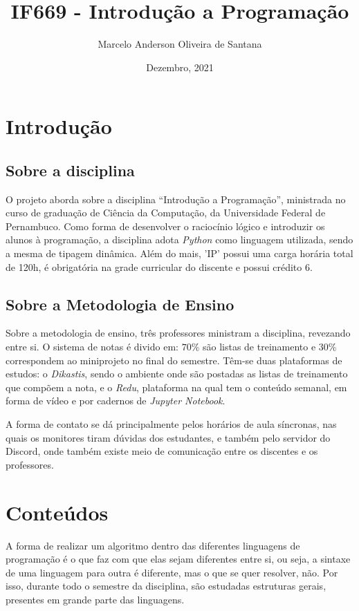 \documentclass[a4paper, 12pt]{article}
\title{IF669 - Introdução a Programação}
\author{Marcelo Anderson Oliveira de Santana}
\date{Dezembro, 2021}
\begin{document}
\maketitle

\section{Introdução}
\subsection{Sobre a disciplina}
O projeto aborda sobre a disciplina “Introdução a Programação”, ministrada no curso de graduação de Ciência da Computação, da Universidade Federal de Pernambuco. Como forma de desenvolver o raciocínio lógico e introduzir os alunos à programação, a disciplina adota \textit{Python} como linguagem utilizada, sendo a mesma de tipagem dinâmica. Além do mais, 'IP' possui uma carga horária total de 120h, é obrigatória na grade curricular do discente e possui crédito 6. 

\subsection{Sobre a Metodologia de Ensino}
Sobre a metodologia de ensino, três professores ministram a disciplina, revezando entre si. O sistema de notas é divido em: $70\%$ são listas de treinamento e $30\%$ correspondem ao miniprojeto no final do semestre. 
Têm-se duas plataformas de estudos: o \textit{Dikastis}, sendo o ambiente onde são postadas as listas de treinamento que compõem a nota, e o \textit{Redu}, plataforma na qual tem o conteúdo semanal, em forma de vídeo e por cadernos de \textit{Jupyter Notebook}.

A forma de contato se dá principalmente pelos horários de aula síncronas, nas quais os monitores tiram dúvidas dos estudantes, e também pelo servidor do Discord, onde também existe meio de comunicação entre os discentes e os professores.

\section{Conteúdos}
A forma de realizar um algoritmo dentro das diferentes linguagens de programação é o que faz com que elas sejam diferentes entre si, ou seja, a sintaxe de uma linguagem para outra é diferente, mas o que se quer resolver, não. Por isso, durante todo o semestre da disciplina, são estudadas estruturas gerais, presentes em grande parte das linguagens. 
\end{document}
